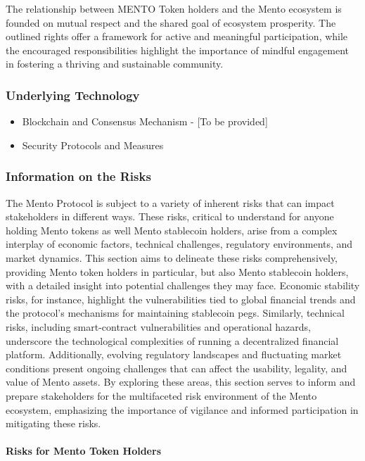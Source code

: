 \documentclass[a4paper]{article}
\theoremstyle{definition}
\begin{document}
\begin{appendices}
The relationship between MENTO Token holders and the Mento ecosystem is founded on mutual respect and the shared goal of ecosystem prosperity. The outlined rights offer a framework for active and meaningful participation, while the encouraged responsibilities highlight the importance of mindful engagement in fostering a thriving and sustainable community.


\subsubsection{Underlying Technology}
\begin{itemize}
    \item Blockchain and Consensus Mechanism - [To be provided]
    \item Security Protocols and Measures
\end{itemize}

\subsubsection{Information on the Risks}
The Mento Protocol is subject to a variety of inherent risks that can impact stakeholders in different ways. These risks, critical to understand for anyone holding Mento tokens as well Mento stablecoin holders, arise from a complex interplay of economic factors, technical challenges, regulatory environments, and market dynamics. This section aims to delineate these risks comprehensively, providing Mento token holders in particular, but also Mento stablecoin holders, with a detailed insight into potential challenges they may face. Economic stability risks, for instance, highlight the vulnerabilities tied to global financial trends and the protocol's mechanisms for maintaining stablecoin pegs. Similarly, technical risks, including smart-contract vulnerabilities and operational hazards, underscore the technological complexities of running a decentralized financial platform. Additionally, evolving regulatory landscapes and fluctuating market conditions present ongoing challenges that can affect the usability, legality, and value of Mento assets. By exploring these areas, this section serves to inform and prepare stakeholders for the multifaceted risk environment of the Mento ecosystem, emphasizing the importance of vigilance and informed participation in mitigating these risks.

\paragraph{Risks for Mento Token Holders}


\end{appendices}
\end{document}
